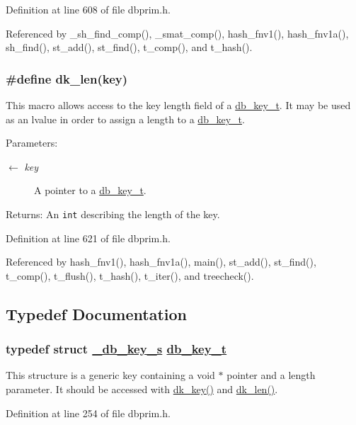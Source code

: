 Definition at line 608 of file dbprim.h.

Referenced by \_\-sh\_\-find\_\-comp(), \_\-smat\_\-comp(), hash\_\-fnv1(), hash\_\-fnv1a(), sh\_\-find(), st\_\-add(), st\_\-find(), t\_\-comp(), and t\_\-hash().\hypertarget{group__dbprim_ga3}{
\subsubsection[dk\_\-len]{\setlength{\rightskip}{0pt plus 5cm}\#define dk\_\-len(key)}}
\label{group__dbprim_ga3}


This macro allows access to the key length field of a \hyperlink{group__dbprim_ga0}{db\_\-key\_\-t}. It may be used as an lvalue in order to assign a length to a \hyperlink{group__dbprim_ga0}{db\_\-key\_\-t}.

\begin{Desc}
\item[Parameters:]
\begin{description}
\item[\mbox{$\leftarrow$} {\em key}]A pointer to a \hyperlink{group__dbprim_ga0}{db\_\-key\_\-t}.\end{description}
\end{Desc}
\begin{Desc}
\item[Returns:]An {\tt int} describing the length of the key.\end{Desc}


Definition at line 621 of file dbprim.h.

Referenced by hash\_\-fnv1(), hash\_\-fnv1a(), main(), st\_\-add(), st\_\-find(), t\_\-comp(), t\_\-flush(), t\_\-hash(), t\_\-iter(), and treecheck().

\subsection{Typedef Documentation}
\hypertarget{group__dbprim_ga0}{
\subsubsection[db\_\-key\_\-t]{\setlength{\rightskip}{0pt plus 5cm}typedef struct \hyperlink{struct__db__key__s}{\_\-db\_\-key\_\-s} \hyperlink{struct__db__key__s}{db\_\-key\_\-t}}}
\label{group__dbprim_ga0}


This structure is a generic key containing a void $\ast$ pointer and a length parameter. It should be accessed with \hyperlink{group__dbprim_ga2}{dk\_\-key()} and \hyperlink{group__dbprim_ga3}{dk\_\-len()}.

Definition at line 254 of file dbprim.h.
